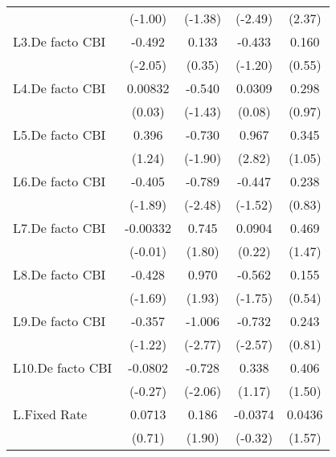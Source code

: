 {\begin{longtable}{l*{4}{c}}
                &  (-1.00)         &  (-1.38)         &  (-2.49)         &   (2.37)         \\
[1em]
L3.De facto CBI &   -0.492\sym{*}  &    0.133         &   -0.433         &    0.160         \\
                &  (-2.05)         &   (0.35)         &  (-1.20)         &   (0.55)         \\
[1em]
L4.De facto CBI &  0.00832         &   -0.540         &   0.0309         &    0.298         \\
                &   (0.03)         &  (-1.43)         &   (0.08)         &   (0.97)         \\
[1em]
L5.De facto CBI &    0.396         &   -0.730         &    0.967\sym{**} &    0.345         \\
                &   (1.24)         &  (-1.90)         &   (2.82)         &   (1.05)         \\
[1em]
L6.De facto CBI &   -0.405         &   -0.789\sym{*}  &   -0.447         &    0.238         \\
                &  (-1.89)         &  (-2.48)         &  (-1.52)         &   (0.83)         \\
[1em]
L7.De facto CBI & -0.00332         &    0.745         &   0.0904         &    0.469         \\
                &  (-0.01)         &   (1.80)         &   (0.22)         &   (1.47)         \\
[1em]
L8.De facto CBI &   -0.428         &    0.970         &   -0.562         &    0.155         \\
                &  (-1.69)         &   (1.93)         &  (-1.75)         &   (0.54)         \\
[1em]
L9.De facto CBI &   -0.357         &   -1.006\sym{**} &   -0.732\sym{*}  &    0.243         \\
                &  (-1.22)         &  (-2.77)         &  (-2.57)         &   (0.81)         \\
[1em]
L10.De facto CBI&  -0.0802         &   -0.728\sym{*}  &    0.338         &    0.406         \\
                &  (-0.27)         &  (-2.06)         &   (1.17)         &   (1.50)         \\
[1em]
L.Fixed Rate    &   0.0713         &    0.186         &  -0.0374         &   0.0436         \\
                &   (0.71)         &   (1.90)         &  (-0.32)         &   (1.57)         \\

\end{longtable}}
